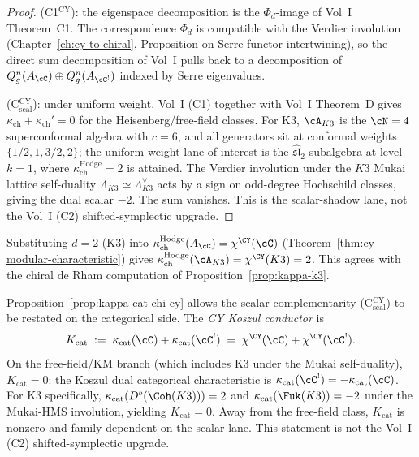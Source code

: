 \begin{proof}
(C1$^{\mathrm{CY}}$): the eigenspace decomposition is the $\Phi_d$-image of Vol~I Theorem~C1. The correspondence $\Phi_d$ is compatible with the Verdier involution (Chapter~\ref{ch:cy-to-chiral}, Proposition on Serre-functor intertwining), so the direct sum decomposition of Vol~I pulls back to a decomposition of $Q_g^n(A_\cC) \oplus Q_g^n(A_{\cC^!})$ indexed by Serre eigenvalues.

(C$_{\mathrm{scal}}^{\mathrm{CY}}$): under uniform weight, Vol~I (C1) together with Vol~I Theorem~D gives $\kappa_{\mathrm{ch}} + \kappa_{\mathrm{ch}}' = 0$ for the Heisenberg/free-field classes. For K3, $\cA_{K3}$ is the $\cN = 4$ superconformal algebra with $c = 6$, and all generators sit at conformal weights $\{1/2, 1, 3/2, 2\}$; the uniform-weight lane of interest is the $\widehat{\mathfrak{sl}}_2$ subalgebra at level $k = 1$, where $\kappa_{\mathrm{ch}}^{\mathrm{Hodge}}=2$ is attained. The Verdier involution under the $K3$ Mukai lattice self-duality $\Lambda_{K3} \simeq \Lambda_{K3}^\vee$ acts by a sign on odd-degree Hochschild classes, giving the dual scalar \(-2\). The sum vanishes. This is the scalar-shadow lane, not the Vol~I (C2) shifted-symplectic upgrade.
\end{proof}

\begin{remark}[CY-D comparison]
\label{rem:cy-d2-cy-d-check}
Substituting $d = 2$ (K3) into $\kappa_{\mathrm{ch}}^{\mathrm{Hodge}}(A_\cC) = \chi^{\CY}(\cC)$ (Theorem~\ref{thm:cy-modular-characteristic}) gives $\kappa_{\mathrm{ch}}^{\mathrm{Hodge}}(\cA_{K3}) = \chi^{\CY}(K3) = 2$. This agrees with the chiral de Rham computation of Proposition~\ref{prop:kappa-k3}.
\end{remark}

\begin{remark}
\label{rem:cy-categorical-complementarity}
Proposition~\ref{prop:kappa-cat-chi-cy} allows the scalar complementarity (C$_{\mathrm{scal}}^{\mathrm{CY}}$) to be restated on the categorical side. The \emph{CY Koszul conductor} is
\[
 K_{\mathrm{cat}} \;:=\; \kappa_{\mathrm{cat}}(\cC) + \kappa_{\mathrm{cat}}(\cC^!) \;=\; \chi^{\CY}(\cC) + \chi^{\CY}(\cC^!).
\]
On the free-field/KM branch (which includes K3 under the Mukai self-duality), $K_{\mathrm{cat}} = 0$: the Koszul dual categorical characteristic is $\kappa_{\mathrm{cat}}(\cC^!) = -\kappa_{\mathrm{cat}}(\cC)$. For K3 specifically, $\kappa_{\mathrm{cat}}(D^b(\Coh(K3))) = 2$ and $\kappa_{\mathrm{cat}}(\Fuk(K3)) = -2$ under the Mukai-HMS involution, yielding $K_{\mathrm{cat}} = 0$. Away from the free-field class, $K_{\mathrm{cat}}$ is nonzero and family-dependent on the scalar lane. This statement is not the Vol~I (C2) shifted-symplectic upgrade.
\end{remark}

